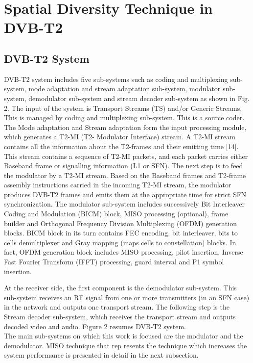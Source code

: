 \documentclass[10pt, conference]{IEEEtran}
\begin{document}

\section{\small Spatial Diversity Technique in DVB-T2}
\subsection{\small DVB-T2 System}
\onehalfspacing
\normalsize{ DVB-T2 system includes five sub-systems such as coding and multiplexing sub-system, mode adaptation and stream adaptation sub-system, modulator sub-system, demodulator sub-system and stream decoder sub-system as shown in Fig. 2. The input of the system is Transport Streams (TS) and/or Generic Streams. This is managed by coding and multiplexing sub-system. This is a source coder. The Mode adaptation and Stream adaptation form the input processing module, which} 
\linespread{1.04} \normalsize{ generates a T2-MI (T2- Modulator Interface) stream. A T2-MI stream contains all the information about the T2-frames and their emitting time [14]. This stream contains a sequence of T2-MI packets, and each packet carries either Baseband frame or signalling information (L1 or SFN). The next step is to feed the modulator by a T2-MI stream. Based on the Baseband frames and T2-frame assembly instructions carried in the incoming T2-MI stream, the modulator produces DVB-T2 frames and emits them at the appropriate time for strict SFN synchronization. The modulator sub-system includes successively Bit Interleaver Coding and Modulation (BICM) block, MISO processing (optional), frame builder and Orthogonal Frequency Division Multiplexing (OFDM) generation blocks. BICM block in its turn contains FEC encoding, bit interleaver, bits to cells demultiplexer and Gray mapping (maps cells to constellation) blocks. In fact, OFDM generation block includes MISO processing, pilot insertion, Inverse Fast Fourier Transform (IFFT) processing, guard interval and P1 symbol insertion.}


\normalsize{
At the receiver side, the first component is the demodulator sub-system. This sub-system receives an RF signal from one or more transmitters (in an SFN case) in the network and outputs one transport stream. The following step is the Stream decoder sub-system, which receives the transport stream and outputs decoded video and audio. Figure 2 resumes DVB-T2 system.\\
The main sub-systems on which this work is focused are the modulator and the demodulator. MISO technique that rep
resents the technique which increases the system performance is presented in detail in the next subsection.
}
\end{document}
